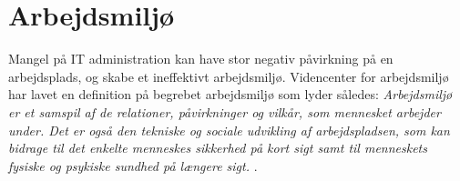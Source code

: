 

\section{Arbejdsmiljø}
\noindent Mangel på IT administration kan have stor negativ påvirkning på en arbejdsplads, og skabe et ineffektivt arbejdsmiljø. Videncenter for arbejdsmiljø har lavet en definition på begrebet arbejdsmiljø som lyder således: \textit{Arbejdsmiljø er et samspil af de relationer, påvirkninger og vilkår, som mennesket arbejder under. Det er også den tekniske og sociale udvikling af arbejdspladsen, som kan bidrage til det enkelte menneskes sikkerhed på kort sigt samt til menneskets fysiske og psykiske sundhed på længere sigt.} \citep{Arbejdsmiljoe}.

